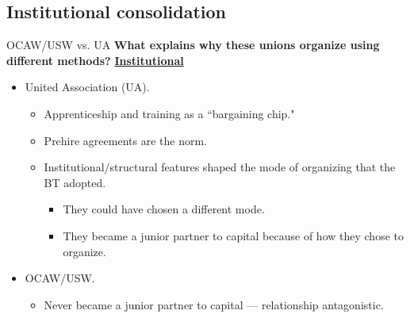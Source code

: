 \documentclass{beamer}
\begin{document}
\subsection{Institutional consolidation}
\begin{frame}{OCAW/USW vs. UA}
\textbf{What explains why these unions organize using different methods?}\newline\newline
\underline{\textbf{Institutional}}
	\begin{itemize}
		\item United Association (UA).		
			\begin{itemize}
				\item Apprenticeship and training as a ``bargaining chip."
				\item Prehire agreements are the norm.
				\item Institutional/structural features shaped the mode of organizing that the BT adopted.
				\begin{itemize}
					\item They could have chosen a different mode.
					\item They became a junior partner to capital because of how they chose to organize.
				\end{itemize}
	\end{itemize}
		\item OCAW/USW.
		\begin{itemize}
			\item Never became a junior partner to capital — relationship antagonistic.
		\end{itemize}
	\end{itemize}
\end{frame}
\end{document}

